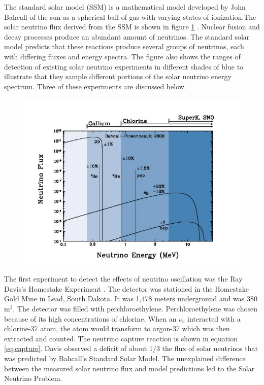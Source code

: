 The standard solar model (SSM) is a mathematical model developed by John Bahcall of the sun as a spherical ball of gas with varying states of ionization.The solar neutrino flux derived from the SSM is shown in figure \ref{fig:solarmodel} \cite{bahcall2}. Nuclear fusion and decay processes produce an abundant amount of neutrinos. The standard solar model predicts that these reactions produce several groups of neutrinos, each with differing fluxes and energy spectra. The figure also shows the ranges of detection of existing solar neutrino experiments in different shades of blue to illustrate that they sample different portions of the solar neutrino energy spectrum. Three of these experiments are discussed below.

\begin{figure}[htp]
\centering
\includegraphics[scale=.55]{figs/solarmodel.jpg}
\label{fig:solarmodel}
\end{figure}

The first experiment to detect the effects of neutrino oscillation was the Ray Davis's Homestake Experiment \cite{raydavis}. The detector was stationed in the Homestake Gold Mine in Lead, South Dakota. It was 1,478 meters underground and was 380 $\text{m}^3$. The detector was filled with perchloroethylene. Perchloroethylene was chosen because of its high concentrations of chlorine. When an $\nu_{e}$ interacted with a chlorine-37 atom, the atom would transform to argon-37 which was then extracted and counted. The neutrino capture reaction is shown in equation \ref{eq:capture}. Davis observed a deficit of about $1/3$ the flux of solar neutrinos that was predicted by Bahcall's Standard Solar Model. The unexplained difference between the measured solar neutrino flux and model predictions led to the Solar Neutrino Problem.

